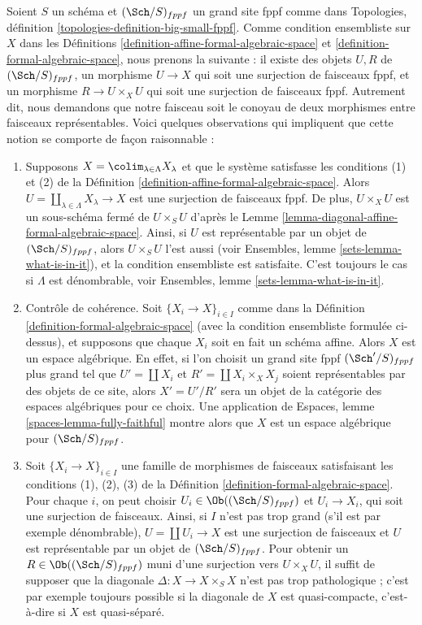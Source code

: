 \begin{remark}
\label{remark-set-theoretic}
Soient $S$ un schéma et $(\Sch/S)_{fppf}$ un grand site fppf comme dans
Topologies, définition \ref{topologies-definition-big-small-fppf}.
Comme condition ensembliste sur $X$ dans les
Définitions \ref{definition-affine-formal-algebraic-space} et
\ref{definition-formal-algebraic-space}, nous prenons la suivante :
il existe des objets $U, R$ de $(\Sch/S)_{fppf}$, un
morphisme $U \to X$ qui soit une surjection de faisceaux fppf, et
un morphisme $R \to U \times_X U$ qui soit une surjection de faisceaux fppf.
Autrement dit, nous demandons que notre faisceau soit le conoyau de
deux morphismes entre faisceaux représentables.
Voici quelques observations qui impliquent que cette notion se comporte
de façon raisonnable :
\begin{enumerate}
\item Supposons $X = \colim_{\lambda \in \Lambda} X_\lambda$
et que le système satisfasse les conditions (1) et (2) de la
Définition \ref{definition-affine-formal-algebraic-space}. Alors
$U = \coprod_{\lambda \in \Lambda} X_\lambda \to X$ est une surjection
de faisceaux fppf. De plus, $U \times_X U$ est un sous-schéma fermé
de $U \times_S U$ d'après le Lemme \ref{lemma-diagonal-affine-formal-algebraic-space}.
Ainsi, si $U$ est représentable par un objet de $(\Sch/S)_{fppf}$,
alors $U \times_S U$ l'est aussi (voir Ensembles, lemme \ref{sets-lemma-what-is-in-it}),
et la condition ensembliste est satisfaite. C'est toujours le cas
si $\Lambda$ est dénombrable, voir Ensembles, lemme \ref{sets-lemma-what-is-in-it}.
\item Contrôle de cohérence. Soit $\{X_i \to X\}_{i \in I}$ comme dans la
Définition \ref{definition-formal-algebraic-space}
(avec la condition ensembliste formulée ci-dessus),
et supposons que chaque $X_i$ soit en fait un schéma affine.
Alors $X$ est un espace algébrique. En effet, si l'on choisit un
grand site fppf $(\Sch'/S)_{fppf}$ plus grand tel que $U' = \coprod X_i$
et $R' = \coprod X_i \times_X X_j$ soient représentables par des objets
de ce site, alors $X' = U'/R'$ sera un objet de la catégorie
des espaces algébriques pour ce choix. Une application de
Espaces, lemme \ref{spaces-lemma-fully-faithful} montre alors que
$X$ est un espace algébrique pour $(\Sch/S)_{fppf}$.
\item Soit $\{X_i \to X\}_{i \in I}$ une famille de morphismes de faisceaux
satisfaisant les conditions (1), (2), (3) de la
Définition \ref{definition-formal-algebraic-space}.
Pour chaque $i$, on peut choisir $U_i \in \Ob((\Sch/S)_{fppf})$
et $U_i \to X_i$, qui soit une surjection de faisceaux.
Ainsi, si $I$ n'est pas trop grand (s'il est par exemple dénombrable),
$U = \coprod U_i \to X$ est une surjection de faisceaux et
$U$ est représentable par un objet de $(\Sch/S)_{fppf}$.
Pour obtenir un $R \in \Ob((\Sch/S)_{fppf})$ muni d'une surjection vers $U \times_X U$,
il suffit de supposer que la diagonale $\Delta : X \to X \times_S X$ n'est pas
trop pathologique ; c'est par exemple toujours possible si la diagonale de $X$ est
quasi-compacte, c'est-à-dire si $X$ est quasi-séparé.
\end{enumerate}
\end{remark}
